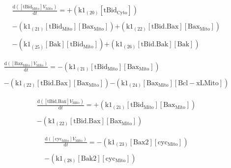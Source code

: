 \documentclass[a4paper,12pt]{article} %
\newcommand{\M}[1]{\mathrm{#1}}
\begin{document}
\begin{equation}
\begin{split}
\frac {\M{d}( {{\M{[tBid_{Mito}]}}    {V}_{\M{Mito}} } ) }  {\M{d}{t} }  =  {  +  ( {{\M{k1}}_{\M{(20)}}    {\M{[tBid_{Cyto}]}} } ) } \\ 
  \\ 
   {  -  ( {{\M{k1}}_{\M{(21)}}    {\M{[tBid_{Mito}]}}    {\M{[Bax_{Mito}]}} } ) } 
   {  +  ( {{\M{k1}}_{\M{(22)}}    {\M{[tBid.Bax]}}    {\M{[Bax_{Mito}]}} } ) } \\ 
  \\ 
   {  -  ( {{\M{k1}}_{\M{(25)}}    {\M{[Bak]}}    {\M{[tBid_{Mito}]}} } ) }
   {  +  ( {{\M{k1}}_{\M{(26)}}    {\M{[tBid.Bak]}}    {\M{[Bak]}} } ) } 
\end{split}
\end{equation}

\begin{equation}
\begin{split}
\frac {\M{d}( {{\M{[Bax_{Mito}]}}    {V}_{\M{Mito}} } ) }  {\M{d}{t} }  =  {  -  ( {{\M{k1}}_{\M{(21)}}    {\M{[tBid_{Mito}]}}    {\M{[Bax_{Mito}]}} } ) } \\ 
  \\ 
   {  -  ( {{\M{k1}}_{\M{(22)}}    {\M{[tBid.Bax]}}    {\M{[Bax_{Mito}]}} } ) } 
   {  -  ( {{\M{k1}}_{\M{(24)}}    {\M{[Bax_{Mito}]}}    {\M{[Bcl-xL{Mito}]}} } ) }
\end{split}
\end{equation}

\begin{equation}
\begin{split}
\frac {\M{d}( {{\M{[tBid.Bax]}}    {V}_{\M{Mito}} } ) }  {\M{d}{t} }  =  {  +  ( {{\M{k1}}_{\M{(21)}}    {\M{[tBid_{Mito}]}}    {\M{[Bax_{Mito}]}} } ) } \\ 
  \\ 
   {  -  ( {{\M{k1}}_{\M{(22)}}    {\M{[tBid.Bax]}}    {\M{[Bax_{Mito}]}} } ) }
\end{split}
\end{equation}

\begin{equation}
\begin{split}
\frac {\M{d}( {{\M{[cyc_{Mito}]}}    {V}_{\M{Mito}} } ) }  {\M{d}{t} }  =  {  -  ( {{\M{k1}}_{\M{(23)}}    {\M{[Bax2]}}    {\M{[cyc_{Mito}]}} } ) } \\ 
  \\ 
   {  -  ( {{\M{k1}}_{\M{(28)}}    {\M{[Bak2]}}    {\M{[cyc_{Mito}]}} } ) }
\end{split}
\end{equation}
\end{document}
